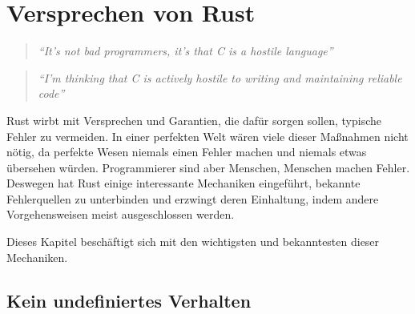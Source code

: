 \label{rust:oop}





\section{Versprechen von Rust}
\label{rust:guarantees}

\begin{quotation}
	\textit{\enquote{It’s not bad programmers, it’s that C is a hostile language}} 
	\cite[54]{rust:c_is_hostile_mena}
\end{quotation}

\begin{quotation}
	\textit{\enquote{I’m thinking that C is actively hostile to writing and maintaining reliable code}} 
	\cite[129]{rust:c_is_hostile_mena}
\end{quotation}

Rust wirbt mit Versprechen und Garantien, die dafür sorgen sollen, typische Fehler zu vermeiden.
In einer perfekten Welt wären viele dieser Maßnahmen nicht nötig, da perfekte Wesen niemals einen Fehler machen und niemals etwas übersehen würden.
Programmierer sind aber Menschen, Menschen machen Fehler.
Deswegen hat Rust einige interessante Mechaniken eingeführt, bekannte Fehlerquellen zu unterbinden und erzwingt deren Einhaltung, indem andere Vorgehensweisen meist ausgeschlossen werden.

Dieses Kapitel beschäftigt sich mit den wichtigsten und bekanntesten dieser Mechaniken.

\subsection{Kein undefiniertes Verhalten}
\label{rust:no_unitialized_usage}
\label{rust:no_undefined}

